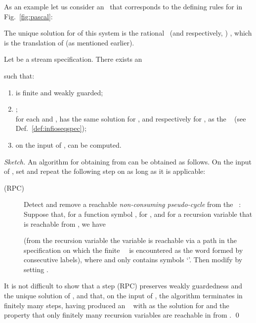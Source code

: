 As an example let us consider an \infioseqspec\ that corresponds to 
 the defining rules for  in Fig.~\ref{fig:pascal}:

The unique solution for  of this system is the rational \ioseq\
(and respectively, \ioterm)
,
which is the translation of  (as mentioned earlier).



\begin{lemma}\label{lem:infioseqspec:build:finite}
Let  be a stream specification.
There exists an \infioseqspec\
  
such that:
\begin{enumerate}
    \renewcommand{\labelenumi}{(\roman{enumi})}
\item  is finite and weakly guarded;    
\item ;\\
for each  
      and ,
       has the same solution 
      for ,
      and respectively for ,
      as the ~ 
      (see Def.~\ref{def:infioseqspec});
\item on the input of ,  
      can be computed. 
\end{enumerate}
\end{lemma}

\begin{proof}[Sketch]
An algorithm for obtaining 
  from  can be obtained as follows.
  On the input of ,
  set  and 
  repeat the following step on  as long as it is applicable:
\begin{description}
\item[{\sf (RPC)}]
      Detect and remove a reachable \emph{non-consuming pseudo-cycle} from the 
      \infioseqspec~:
      Suppose that, for a function symbol , for ,
      and for a recursion variable  that is reachable
      from , we have
      
      (from the recursion variable 
       the variable  is reachable
       via a path in the specification on which the finite~\ioseq~
       is encountered as the word formed by consecutive labels),
      where  and  only contains symbols `'.
      Then modify  by setting
      .
\end{description}
It is not difficult to show that a step {\sf (RPC)} 
  preserves weakly guardedness and the unique solution 
  of , 
  and that, on the input of , 
  the algorithm terminates in finitely many steps, 
  having produced an \infioseqspec~ 
  with  as the solution for 
  and the property
  that only finitely many recursion variables are reachable
  in  from
  .
  \qed
\end{proof}


